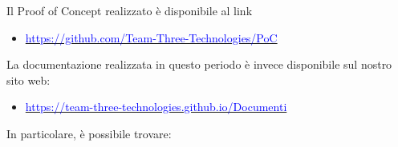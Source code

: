 \documentclass[a4paper,12pt]{article}
\begin{document}
Il Proof of Concept realizzato è disponibile al link
\begin{itemize}
    \item \href{https://github.com/Team-Three-Technologies/PoC}{\textcolor{blue} {https://github.com/Team-Three-Technologies/PoC}}
\end{itemize}

La documentazione realizzata in questo periodo è invece disponibile sul nostro sito web: 

\begin{itemize}
    \item \href{https://team-three-technologies.github.io/Documenti}{\textcolor{blue} {https://team-three-technologies.github.io/Documenti}}
\end{itemize}

In particolare, è possibile trovare: 
\end{document}
